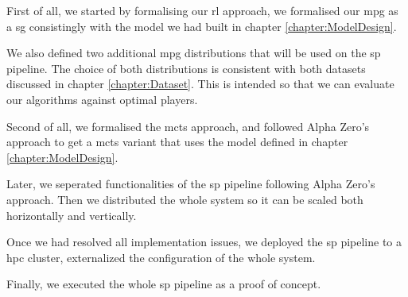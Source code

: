 First of all, we started by formalising our \acrshort{rl} approach, we formalised our \acrshort{mpg} as a \acrshort{sg} consistingly with the model we had built in chapter \ref{chapter:ModelDesign}. 

We also defined two additional \acrshort{mpg} distributions that will be used on the \acrshort{sp} pipeline. The choice of both distributions is consistent with both datasets discussed in chapter \ref{chapter:Dataset}. This is intended so that we can evaluate our algorithms against optimal players.

Second of all, we formalised the \acrshort{mcts} approach, and followed Alpha Zero's approach to get a \acrshort{mcts} variant that uses the model defined in chapter \ref{chapter:ModelDesign}.

Later, we seperated functionalities of the \acrshort{sp} pipeline following Alpha Zero's approach. Then we distributed the whole system so it can be scaled both horizontally and vertically.

Once we had resolved all implementation issues, we deployed the \acrshort{sp} pipeline to a \acrshort{hpc} cluster, externalized the configuration of the whole system.

Finally, we executed the whole \acrshort{sp} pipeline as a proof of concept.